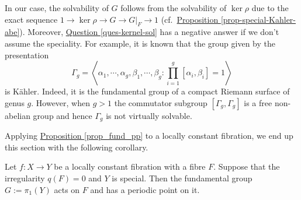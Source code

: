  
In our case, the solvability of $G$ follows from the solvability of $\ker\rho$ due to the exact sequence $1\to \ker\rho\to G\to G|_F\to 1$  (cf.~{\hyperref[prop-special-Kahler-abe]{Proposition  \ref*{prop-special-Kahler-abe}}}). 
Moreover, {\hyperref[ques-kernel-sol]{Question   \ref*{ques-kernel-sol}}} has a negative answer if we don't assume
the speciality.  
For example, 
it is known that the group given by the presentation
$$\Gamma_g=\left<\alpha_1,\cdots,\alpha_g,\beta_1,\cdots,\beta_g:\prod_{i=1}^g[\alpha_i,\beta_i]=1\right>$$
is K\"ahler.
Indeed, it is the fundamental group of a compact Riemann surface of genus $g$.
However, when $g>1$ the commutator subgroup $[\Gamma_g,\Gamma_g]$ is a free non-abelian group and hence $\Gamma_g$ is not virtually solvable. 


Applying {\hyperref[prop_fund_pp]{Proposition  \ref*{prop_fund_pp}}} to a locally constant fibration, we end up this section with the following corollary. %
\begin{cor}\label{cor-lc-periodic}
Let $f:X\to Y$ be a locally constant fibration with a fibre $F$.
Suppose that the irregularity $q(F)=0$ and $Y$ is special.
Then the fundamental group $G:=\pi_1(Y)$ acts on $F$ and has a periodic point on it.
\end{cor}


